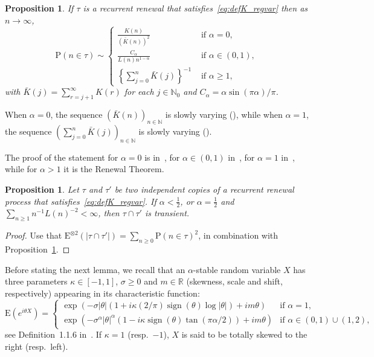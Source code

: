 \documentclass[11pt]{article}
\newtheorem{prop}[theo]{Proposition}
\theoremstyle{definition}
\numberwithin{equation}{section}
\numberwithin{figure}{section}
\numberwithin{table}{section}
\DeclareMathOperator{\sign}{sign}
\newcommand{\bbN}{{\ensuremath{\mathbb N}}}
\newcommand{\bbR}{{\ensuremath{\mathbb R}}}
\newcommand{\ga}{\alpha}
\newcommand\bP{\ensuremath{\mathrm{P}}}
\newcommand\bE{\ensuremath{\mathrm{E}}}
\newcommand*{\MK}{\mkern 2mu}
\begin{document}
\begin{prop}\label{RMassFunctionProp}
If $\tau$ is a recurrent renewal that satisfies~\eqref{eq:defK_regvar} then as $n \to \infty$,
\begin{equation}\label{RMassFunction}
\bP(n \in \tau) \sim
\begin{cases}
\frac{K(n)}{(\bar K(n))^2} & \text{ if } \ga = 0,\\[4pt]
\frac{C_\ga}{L(n) n^{1 - \ga}} & \text{ if } \ga \in (0,1),\\[4pt]
\left\{ \sum_{j=0}^n \bar K(j) \right\}^{-1} & \text{ if } \ga \geq 1,
\end{cases}
\end{equation}
with $\bar K(j) = \sum_{r=j+1}^\infty K(r)$ for each $j\in\bbN_0$ and $C_\ga = \ga \sin(\pi \ga)/\pi$.
\end{prop}

When $\ga = 0$, the sequence $(\bar K(n))_{n\in\bbN}$ is slowly varying (\cite[Propos-\linebreak ition~1.5.9$\MK$(b)]{BGT89}), while when $\ga = 1$, the sequence $(\sum_{j=0}^ n \bar K(j))_{n\in\bbN}$ is slowly varying (\cite[Prop\-os\-itions~1.5.10 and~1.5.9$\MK$(a)]{BGT89}).

The proof of the statement for $\ga = 0$ is in~\cite[Theorem~1.1]{Na2012}, for $\ga \in (0,1)$ in~\cite[Theorem~1.1]{GL63}, for $\ga = 1$ in~\cite[Theorem~8.7.5]{BGT89}, while for $\ga > 1$ it is the Renewal Theorem.

\begin{prop}\label{pr:transient.inter}
Let $\tau$ and $\tau'$ be two independent copies of a recurrent renewal process that satisfies~\eqref{eq:defK_regvar}. If $\ga < \frac{1}{2}$, or $\ga = \frac{1}{2}$ and $\sum_{n\geq1} n^{-1} L(n)^{-2} < \infty$, then $\tau \cap \tau'$ is transient.
\end{prop}

\begin{proof}
Use that $\bE^{\otimes 2}(|\tau \cap \tau'|) = \sum_{n\geq0} \bP(n \in \tau)^2$, in combination with Prop\-os\-ition~\ref{RMassFunctionProp}.
\end{proof}

Before stating the next lemma, we recall that an $\ga$-stable random variable $X$ has three parameters $\kappa\in[-1,1]$, $\sigma\ge 0$ and $m\in \bbR$ (skewness, scale and shift, respectively) appearing in its characteristic function:
\begin{equation} \label{eq:stable.cf}
\bE(e^{i\theta X}) =
\begin{cases}
\exp(-\sigma |\theta| (1 + i\kappa (2/\pi) \sign(\theta) \log|\theta|) + im\theta) & \text{if }\ga = 1,\\[4pt]
\exp(-\sigma^\ga |\theta|^\ga (1 - i\kappa \sign(\theta) \tan(\pi \ga /2)) + im\theta) & \text{if } \ga\in(0, 1)\cup(1,2),
\end{cases}
\end{equation} see Definition~1.1.6 in~\cite{ST94}. If $\kappa =1$ (resp.\ $-1$), $X$ is said to be totally skewed to the right (resp.\ left).
\end{document}
